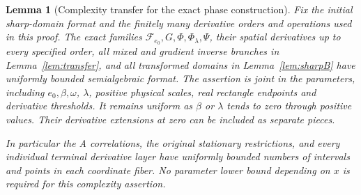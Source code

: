 \documentclass[11pt,a4paper]{article}
\numberwithin{equation}{section}
\newtheorem{lemma}[theorem]{Lemma}
\theoremstyle{remark}
\begin{document}
\begin{lemma}[Complexity transfer for the exact phase construction]
\label{lem:exact-complexity}
Fix the initial sharp-domain format and the finitely many derivative
orders and operations used in this proof. The exact families
$\mathcal F_{e_0},G,\Phi,\Phi_\lambda,\Psi$, their spatial derivatives
up to every specified order, all mixed and gradient inverse branches in
Lemma~\ref{lem:transfer}, and all transformed domains in
Lemma~\ref{lem:sharpB} have uniformly bounded semialgebraic format.
The assertion is joint in the parameters, including $e_0,\beta,\omega$,
$\lambda$, positive physical scales, real rectangle endpoints and
derivative thresholds. It remains uniform as $\beta$ or $\lambda$ tends
to zero through positive values. Their derivative extensions at zero
can be included as separate pieces.

In particular the A correlations, the original stationary restrictions,
and every individual terminal derivative layer have uniformly bounded
numbers of intervals and points in each coordinate fiber. No parameter
lower bound depending on $x$ is required for this complexity assertion.
\end{lemma}
\end{document}
